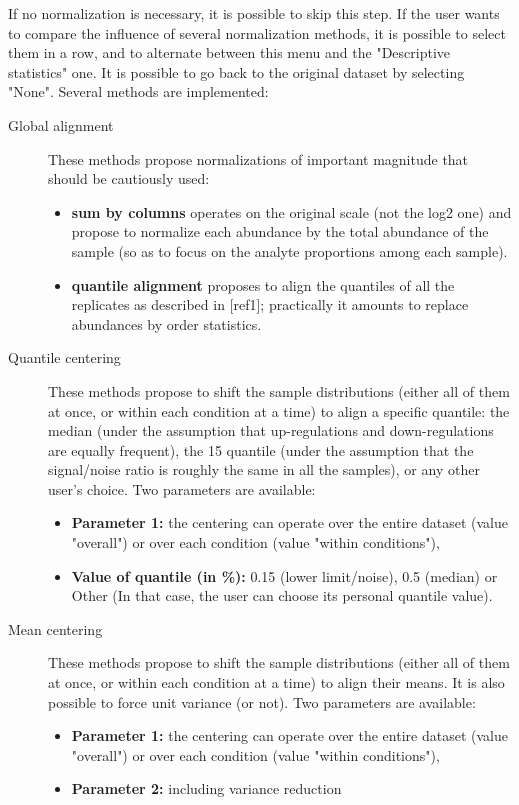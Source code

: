 \documentclass[12pt]{article}
\begin{document}
If no normalization is necessary, it is possible to skip this step.
If the user wants to compare the influence of several normalization methods, 
it is possible to select them in a row, and to alternate between this menu 
and the "Descriptive statistics" one. It is possible to go back to the 
original dataset by selecting "None".
Several methods are implemented:
\begin {description}
\item[Global alignment]
These methods propose normalizations of important magnitude that should be cautiously used:
\begin{itemize}
\item \textbf{sum by columns} operates on the original scale (not the log2 one) and propose to normalize each abundance by the total abundance of the sample (so as to focus on the analyte proportions among each sample).
\item \textbf{quantile alignment} proposes to align the quantiles of all the replicates as described in [ref1]; practically it amounts to replace abundances by order statistics.\newline
\end{itemize}


\item[Quantile centering]
These methods propose to shift the sample distributions (either all of them at once, or within each condition at a time) to align a specific quantile: the median (under the assumption that up-regulations and down-regulations are equally frequent), the 15 quantile (under the assumption that the signal/noise ratio is roughly the same in all the samples), or any other user's choice. Two parameters are available:
\begin{itemize}
\item \textbf{Parameter 1: } the centering can operate over the entire dataset (value "overall") or over each condition (value "within conditions"),
\item \textbf{Value of quantile (in \%): } 0.15 (lower limit/noise), 0.5 (median) or Other (In that case, the user can choose its personal quantile value).\newline
\end{itemize}


\item[Mean centering]
These methods propose to shift the sample distributions (either all of them at once, or within each condition at a time) to align their means. It is also possible to force unit variance (or not). Two parameters are available:
\begin{itemize}
\item \textbf{Parameter 1: } the centering can operate over the entire dataset (value "overall") or over each condition (value "within conditions"),
\item \textbf{Parameter 2: } including variance reduction
\end{itemize}


\end{description}
\end{document}
